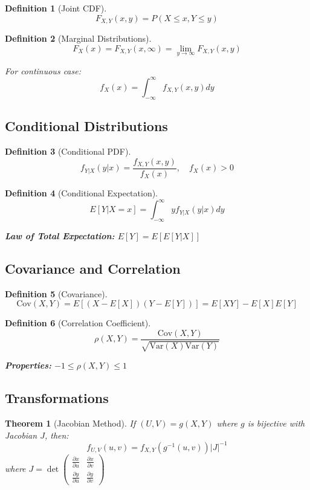 \documentclass[12pt,a4paper]{amsart}
\newtheorem{theorem}{Theorem}[section]
\newtheorem{definition}{Definition}[section]
\theoremstyle{remark}
\begin{document}
\begin{definition}[Joint CDF]
$$F_{X,Y}(x,y) = P(X \leq x, Y \leq y)$$
\end{definition}

\begin{definition}[Marginal Distributions]
$$F_X(x) = F_{X,Y}(x, \infty) = \lim_{y \to \infty} F_{X,Y}(x,y)$$

For continuous case:
$$f_X(x) = \int_{-\infty}^{\infty} f_{X,Y}(x,y) dy$$
\end{definition}

\subsection{Conditional Distributions}

\begin{definition}[Conditional PDF]
$$f_{Y|X}(y|x) = \frac{f_{X,Y}(x,y)}{f_X(x)}, \quad f_X(x) > 0$$
\end{definition}

\begin{definition}[Conditional Expectation]
$$E[Y|X = x] = \int_{-\infty}^{\infty} y f_{Y|X}(y|x) dy$$

\textbf{Law of Total Expectation:} $E[Y] = E[E[Y|X]]$
\end{definition}

\subsection{Covariance and Correlation}

\begin{definition}[Covariance]
$$\text{Cov}(X,Y) = E[(X - E[X])(Y - E[Y])] = E[XY] - E[X]E[Y]$$
\end{definition}

\begin{definition}[Correlation Coefficient]
$$\rho(X,Y) = \frac{\text{Cov}(X,Y)}{\sqrt{\text{Var}(X)\text{Var}(Y)}}$$

\textbf{Properties:} $-1 \leq \rho(X,Y) \leq 1$
\end{definition}

\subsection{Transformations}

\begin{theorem}[Jacobian Method]
If $(U,V) = g(X,Y)$ where $g$ is bijective with Jacobian $J$, then:
$$f_{U,V}(u,v) = f_{X,Y}(g^{-1}(u,v)) |J|^{-1}$$
where $J = \det\begin{pmatrix} \frac{\partial x}{\partial u} & \frac{\partial x}{\partial v} \\ \frac{\partial y}{\partial u} & \frac{\partial y}{\partial v} \end{pmatrix}$
\end{theorem}
\end{document}
